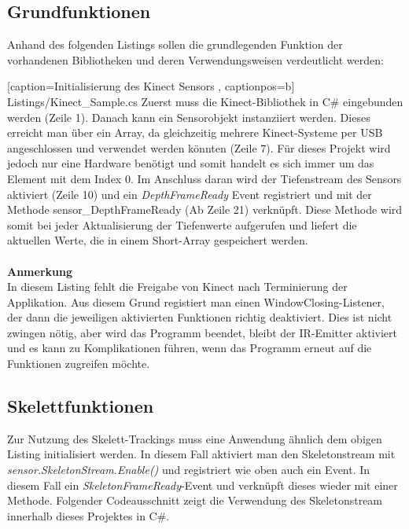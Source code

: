 %
%

\subsection{Grundfunktionen}
Anhand des folgenden Listings sollen die grundlegenden Funktion der vorhandenen Bibliotheken und deren Verwendungsweisen verdeutlicht werden:


    [caption={Initialisierung des Kinect Sensors \cite{pdf:maccormick}}
       \label{lst:kinect_sdk},
       captionpos=b]
 {Listings/Kinect_Sample.cs}
\noindent
Zuerst muss die Kinect-Bibliothek in C\# eingebunden werden (Zeile 1). Danach kann ein Sensorobjekt instanziiert werden. Dieses erreicht man über ein Array, da gleichzeitig mehrere Kinect-Systeme per USB angeschlossen und verwendet werden könnten (Zeile 7). Für dieses Projekt wird jedoch nur eine Hardware benötigt und somit handelt es sich immer um das Element mit dem Index 0. Im Anschluss daran wird der Tiefenstream des Sensors aktiviert (Zeile 10) und ein \textit{DepthFrameReady} Event registriert und mit der Methode sensor\_DepthFrameReady (Ab Zeile 21) verknüpft. Diese Methode wird somit bei jeder Aktualisierung der Tiefenwerte aufgerufen und liefert die aktuellen Werte, die in einem Short-Array gespeichert werden. \\ \\
\textbf{Anmerkung}\\
In diesem Listing fehlt die Freigabe von Kinect nach Terminierung der Applikation. Aus diesem Grund
registiert man einen WindowClosing-Listener, der dann die jeweiligen aktivierten Funktionen richtig deaktiviert. Dies ist nicht zwingen nötig, aber wird das Programm beendet, bleibt der IR-Emitter aktiviert und es kann zu Komplikationen führen, wenn das Programm erneut auf die Funktionen zugreifen möchte.

\subsection{Skelettfunktionen}
Zur Nutzung des Skelett-Trackings muss eine Anwendung ähnlich dem obigen Listing initialisiert werden.
In diesem Fall aktiviert man den Skeletonstream mit \textit{sensor.SkeletonStream.Enable()} und registriert wie oben auch ein Event. In diesem Fall ein \textit{SkeletonFrameReady}-Event und verknüpft dieses wieder mit einer Methode. Folgender Codeausschnitt zeigt die Verwendung des Skeletonstream innerhalb dieses Projektes in C\#.\\

